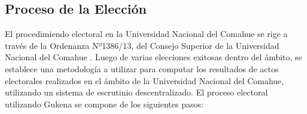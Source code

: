 \subsection{Proceso de la Elección}

El procedimiendo electoral en la Universidad Nacional del Comahue se rige a través de la Ordenanza Nº1386/13, del Consejo Superior de la Universidad Nacional del Comahue \cite{ordenanzaUncoma}. Luego de varias elecciones exitosas dentro del ámbito, se establece una metodología a utilizar para computar los resultados de actos electorales realizados en el ámbito de la Universidad Nacional del Comahue, utilizando un sistema de escrutinio descentralizado. \newline
El proceso electoral utilizando Gukena se compone de los siguientes pasos:
